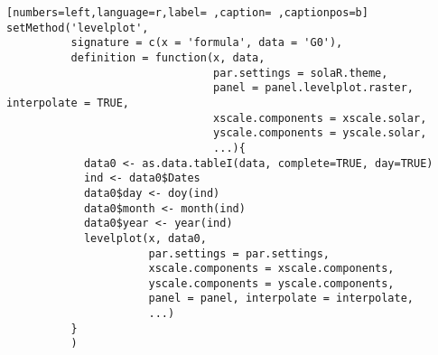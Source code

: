 \begin{lstlisting}[numbers=left,language=r,label= ,caption= ,captionpos=b]
setMethod('levelplot',
          signature = c(x = 'formula', data = 'G0'),
          definition = function(x, data,
                                par.settings = solaR.theme,
                                panel = panel.levelplot.raster, interpolate = TRUE,
                                xscale.components = xscale.solar,
                                yscale.components = yscale.solar,
                                ...){
            data0 <- as.data.tableI(data, complete=TRUE, day=TRUE)
            ind <- data0$Dates
            data0$day <- doy(ind)
            data0$month <- month(ind)
            data0$year <- year(ind)
            levelplot(x, data0, 
                      par.settings = par.settings,
                      xscale.components = xscale.components,
                      yscale.components = yscale.components,
                      panel = panel, interpolate = interpolate,
                      ...)
          }
          )
\end{lstlisting}
